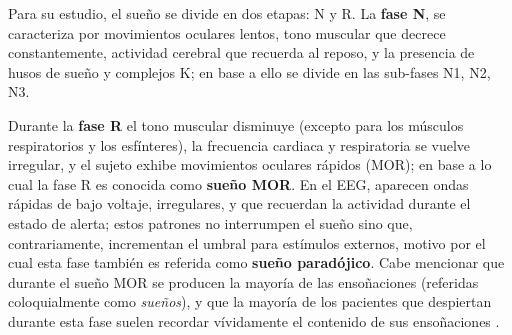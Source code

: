 Para su estudio, el sueño se divide en dos etapas: N y R.
La \textbf{fase N}, se caracteriza por movimientos oculares lentos, tono 
muscular que decrece constantemente, actividad cerebral que recuerda al reposo, y la presencia de
husos de sueño y complejos K; en base a ello se divide en las sub-fases N1, N2, N3.
%

Durante la \textbf{fase R} el tono muscular disminuye (excepto para los músculos respiratorios 
y los esfínteres), la frecuencia cardiaca y respiratoria se vuelve irregular, y el sujeto exhibe 
movimientos oculares rápidos (MOR); en base a lo cual la fase R es conocida 
como \textbf{sueño MOR}.
En el EEG, aparecen ondas rápidas de bajo voltaje, irregulares, y que recuerdan la actividad 
durante el estado de alerta; estos patrones no interrumpen el sueño sino que, contrariamente,
incrementan el umbral para estímulos externos, motivo por el cual esta fase también es referida como 
\textbf{sueño paradójico}.
%
Cabe mencionar que durante el sueño MOR se producen la mayoría de las ensoñaciones (referidas 
coloquialmente como \textit{sueños}), y que la mayoría de los pacientes que despiertan durante esta 
fase suelen recordar vívidamente el contenido de sus ensoñaciones 
\cite{Rosales14}.

